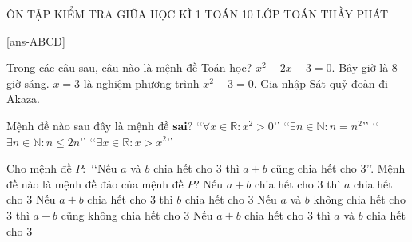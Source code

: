 \begin{name}
	{ÔN TẬP KIỂM TRA GIỮA HỌC KÌ 1}
	{TOÁN 10}
	{LỚP TOÁN THẦY PHÁT}
	{\thoigian}
\end{name}

\caulc

[ans-ABCD]

\begin{ex}%
	Trong các câu sau, câu nào là mệnh đề Toán học?
	\def\dotEX{}
	\choice
	{$x^2-2x-3=0$.}
	{Bây giờ là 8 giờ sáng.}
	{\True $x=3$ là nghiệm phương trình $x^2-3=0$.}
	{Gia nhập Sát quỷ đoàn đi Akaza.}
\end{ex}

\begin{ex}%
	Mệnh đề nào sau đây là mệnh đề \textbf{sai}?
	\choice
	{\True \lq\lq $\forall x\in \mathbb{R}\colon x^2>0$\rq\rq}
	{\lq\lq $\exists n\in \mathbb{N}\colon n=n^2$\rq\rq}
	{\lq\lq $\exists n\in \mathbb{N}\colon n\leq 2n$\rq\rq}
	{\lq\lq $\exists x\in \mathbb{R}\colon x>x^2$\rq\rq}
\end{ex}

\begin{ex}%
	Cho mệnh đề $P\colon$ \lq\lq Nếu $a$ và $b$ chia hết cho $3$ thì $a+b$ cũng chia hết cho $3$\rq\rq. Mệnh đề nào là mệnh đề đảo của mệnh đề $P$?
	\choice
	{Nếu $a+b$ chia hết cho $3$ thì $a$ chia hết cho $3$}
	{Nếu $a+b$ chia hết cho $3$ thì $b$ chia hết cho $3$}
	{Nếu $a$ và $b$ không chia hết cho $3$ thì $a+b$ cũng không chia hết cho $3$}
	{\True Nếu $a+b$ chia hết cho $3$ thì $a$ và $b$ chia hết cho $3$}
\end{ex}

